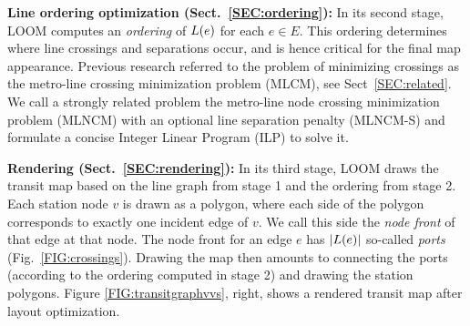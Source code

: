 \documentclass[sigconf]{acmart}
\begin{document}
\smallskip\noindent
{\bf Line ordering optimization (Sect.~\ref{SEC:ordering}):}
In its second stage, LOOM computes an \emph{ordering} of $L(e)$ for each $e \in E$.
This ordering determines where line crossings and separations occur, and is hence critical for the final map appearance.
Previous research referred to the problem of minimizing crossings as the metro-line crossing minimization problem (MLCM), see Sect~\ref{SEC:related}. We call a strongly related problem the metro-line node crossing minimization problem (MLNCM) with an optional line separation penalty (MLNCM-S) and formulate a concise Integer Linear Program (ILP) to solve it.

\smallskip\noindent
{\bf Rendering (Sect.~\ref{SEC:rendering}):}
In its third stage, LOOM draws the transit map based on the line graph from stage 1 and the ordering from stage 2.
Each station node $v$ is drawn as a polygon, where each side of the polygon corresponds to exactly one incident edge of $v$.
We call this side the \emph{node front} of that edge at that node.
The node front for an edge $e$ has $|L(e)|$ so-called \emph{ports} (Fig.~\ref{FIG:crossings}).
Drawing the map then amounts to connecting the ports (according to the ordering computed in stage 2) and drawing the station polygons.
Figure \ref{FIG:transitgraphvvs}, right, shows a rendered transit map after layout optimization.
\end{document}

